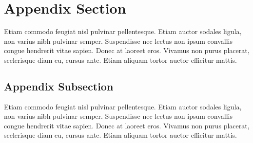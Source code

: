 \documentclass[manuscript,screen,review]{acmart}
\begin{document}




\appendix

\section{Appendix Section}

Etiam commodo feugiat nisl pulvinar pellentesque. Etiam auctor sodales
ligula, non varius nibh pulvinar semper. Suspendisse nec lectus non
ipsum convallis congue hendrerit vitae sapien. Donec at laoreet
eros. Vivamus non purus placerat, scelerisque diam eu, cursus
ante. Etiam aliquam tortor auctor efficitur mattis.

\subsection{Appendix Subsection}

Etiam commodo feugiat nisl pulvinar pellentesque. Etiam auctor sodales
ligula, non varius nibh pulvinar semper. Suspendisse nec lectus non
ipsum convallis congue hendrerit vitae sapien. Donec at laoreet
eros. Vivamus non purus placerat, scelerisque diam eu, cursus
ante. Etiam aliquam tortor auctor efficitur mattis.
\end{document}
